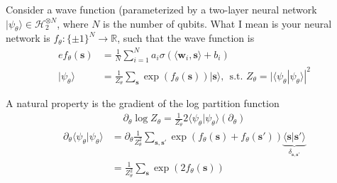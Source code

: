 \documentclass[12pt,fleqn]{article}
\numberwithin{equation}{section} %
\begin{document}
Consider a wave function (parameterized by a two-layer neural network $|\psi_\theta\rangle \in \mathcal H_2^{\otimes N}$, where $N$ is the number of qubits. What I mean is your neural network is $f_\theta : \{\pm 1\}^N \to \mathbb R$, such that the wave function is
\begin{align}e
	f_\theta(\mathbf s) & = \frac{1}{N} \sum_{i=1}^N a_i \sigma(\langle \mathbf w_i, \mathbf s \rangle + b_i)\\
	| \psi_\theta \rangle & = \frac{1}{Z_\theta} \sum_{\mathbf s}\exp \left ( f_\theta (\mathbf s)\right) |\mathbf s\rangle, ~~ \text{s.t. } Z_\theta = |\langle \psi_\theta | \psi_\theta \rangle|^2
\end{align}
\begin{sidework}
	A natural property is the gradient of the log partition function
	\begin{align}
		\partial_\theta \log Z_\theta = \frac{1}{Z_\theta}  2 \langle \psi_\theta | \psi_\theta\rangle \left ( \partial_\theta \right)  
	\end{align}
	\begin{align}
		\partial_\theta  \langle \psi_\theta | \psi_\theta \rangle & = \partial_\theta \frac{1}{Z_\theta^2} \sum_{\mathbf s, \mathbf s'} \exp(f_\theta(\mathbf s) + f_\theta(\mathbf s'))  \underbrace{\langle \mathbf s | \mathbf s'\rangle}_{\delta_{\mathbf s, \mathbf s'}} \\
		& = \frac{1}{Z^2_\theta} \sum_{\mathbf s} \exp(2 f_\theta(\mathbf s))  
	\end{align}
\end{sidework}
\end{document}
